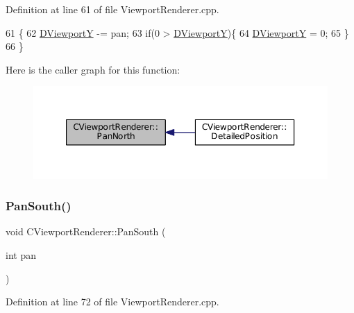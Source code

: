 Definition at line 61 of file Viewport\+Renderer.\+cpp.


\begin{DoxyCode}
61                                        \{
62     \hyperlink{classCViewportRenderer_ae13dd437a3da3d2bab16bc7ba61cb78f}{DViewportY} -= pan;
63     \textcolor{keywordflow}{if}(0 > \hyperlink{classCViewportRenderer_ae13dd437a3da3d2bab16bc7ba61cb78f}{DViewportY})\{
64         \hyperlink{classCViewportRenderer_ae13dd437a3da3d2bab16bc7ba61cb78f}{DViewportY} = 0;
65     \}
66 \}
\end{DoxyCode}
Here is the caller graph for this function\+:\nopagebreak
\begin{figure}[H]
\begin{center}
\leavevmode
\includegraphics[width=350pt]{classCViewportRenderer_a3dae20056eb4f9fc1c7d8238737ab290_icgraph}
\end{center}
\end{figure}
\hypertarget{classCViewportRenderer_ad4aa68d96923dbea1bfd9ae3f23a3132}{}\label{classCViewportRenderer_ad4aa68d96923dbea1bfd9ae3f23a3132} 
\subsubsection{\texorpdfstring{Pan\+South()}{PanSouth()}}
{\footnotesize\ttfamily void C\+Viewport\+Renderer\+::\+Pan\+South (\begin{DoxyParamCaption}\item[{int}]{pan }\end{DoxyParamCaption})}



Definition at line 72 of file Viewport\+Renderer.\+cpp.


